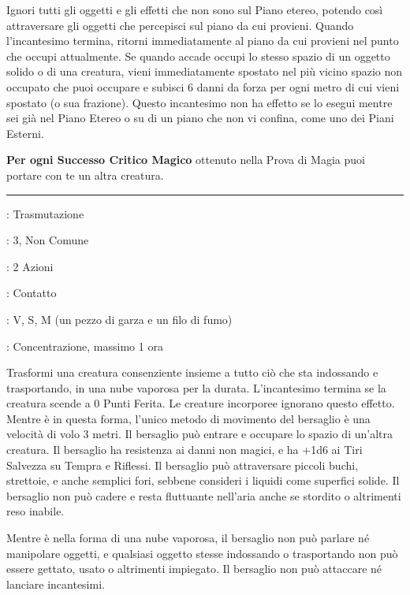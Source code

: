 \begin{multicols}{2}
Ignori tutti gli oggetti e gli effetti che non sono sul Piano etereo, potendo così attraversare gli oggetti che percepisci sul piano da cui provieni. Quando l'incantesimo termina, ritorni immediatamente al piano da cui provieni nel punto che occupi attualmente. Se quando accade occupi lo stesso spazio di un oggetto solido o di una creatura, vieni immediatamente spostato nel più vicino spazio non occupato che puoi occupare e subisci 6 danni da forza per ogni metro di cui vieni spostato (o sua frazione). Questo incantesimo non ha effetto se lo esegui mentre sei già nel Piano Etereo o su di un piano che non vi confina, come uno dei Piani Esterni.

\textbf{Per ogni Successo Critico Magico} ottenuto nella Prova di Magia puoi portare con te un altra creatura.

\smallskip\noindent\rule{\linewidth}{2pt} \hypertarget{Forma Gassosa}{}\medskip{}
\noindent
\begin{description}[noitemsep, topsep=0pt, parsep=0pt, partopsep=0pt, leftmargin=0cm, labelwidth=2.8cm]
	\item[\textbf{Lista di Magia}]: Trasmutazione
	\item[\textbf{Livello}]: 3, Non Comune
	\item[\textbf{T. di Lancio}]: 2 Azioni
	\item[\textbf{Gittata}]: Contatto
	\item[\textbf{Componenti}]: V, S, M (un pezzo di garza e un filo di fumo)
	\item[\textbf{Durata}]: Concentrazione, massimo 1 ora
\end{description}

Trasformi una creatura consenziente insieme a tutto ciò che sta indossando e trasportando, in una nube vaporosa per la durata. L'incantesimo termina se la creatura scende a 0 Punti Ferita. Le creature incorporee ignorano questo effetto. Mentre è in questa forma, l'unico metodo di movimento del bersaglio è una velocità di volo 3 metri. Il bersaglio può entrare e occupare lo spazio di un'altra creatura. Il bersaglio ha resistenza ai danni non magici, e ha +1d6 ai Tiri Salvezza su Tempra e Riflessi. Il bersaglio può attraversare piccoli buchi, strettoie, e anche semplici fori, sebbene consideri i liquidi come superfici solide. Il bersaglio non può cadere e resta fluttuante nell'aria anche se stordito o altrimenti reso inabile.

Mentre è nella forma di una nube vaporosa, il bersaglio non può parlare né manipolare oggetti, e qualsiasi oggetto stesse indossando o trasportando non può essere gettato, usato o altrimenti impiegato. Il bersaglio non può attaccare né lanciare incantesimi.


\end{multicols}
